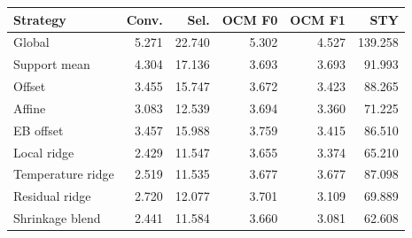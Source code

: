 \begin{tabular}{lrrrrr}
\toprule
Strategy & Conv. & Sel. & OCM F0 & OCM F1 & STY \\
\midrule
Global & 5.271 & 22.740 & 5.302 & 4.527 & 139.258 \\
Support mean & 4.304 & 17.136 & 3.693 & 3.693 & 91.993 \\
Offset & 3.455 & 15.747 & 3.672 & 3.423 & 88.265 \\
Affine & 3.083 & 12.539 & 3.694 & 3.360 & 71.225 \\
EB offset & 3.457 & 15.988 & 3.759 & 3.415 & 86.510 \\
Local ridge & 2.429 & 11.547 & 3.655 & 3.374 & 65.210 \\
Temperature ridge & 2.519 & 11.535 & 3.677 & 3.677 & 87.098 \\
Residual ridge & 2.720 & 12.077 & 3.701 & 3.109 & 69.889 \\
Shrinkage blend & 2.441 & 11.584 & 3.660 & 3.081 & 62.608 \\
\bottomrule
\end{tabular}
